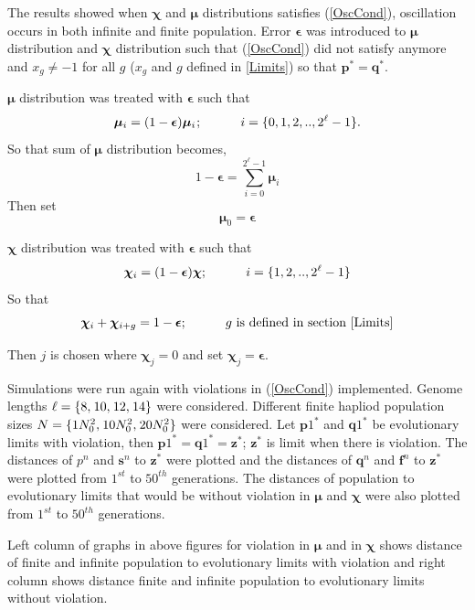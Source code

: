 The results showed when $\bm{\chi}$ and $\bm{\mu}$ distributions satisfies (\ref{OscCond}), oscillation occurs in both infinite and finite population. 
Error $\bm{\epsilon}$ was introduced to $\bm{\mu}$ distribution and $\bm{\chi}$ distribution such that (\ref{OscCond}) did not satisfy anymore and 
$x_g \neq −1$ for all $g$ ($x_g$ and $g$ defined in \ref{Limits}) so that $\bm{p}^\ast = \bm{q}^\ast$.

$\bm{\mu}$ distribution was treated with $\bm{\epsilon}$ such that
\[
\bm{\mu}_i = (1-\bm{\epsilon}) \bm{\mu}_i \hspace{0.01in}; \hspace{30pt} i = \{0, 1, 2,.., 2^{\ell}-1\}.
\]
So that sum of $\bm{\mu}$ distribution becomes, 
\[
1-\bm{\epsilon} = \sum \limits_{i=0}^{2^{\ell}-1} \bm{\mu}_i
\]
Then set
\[
\bm{\mu}_0 = \bm{\epsilon}
\]

$\bm{\chi}$ distribution was treated with $\bm{\epsilon}$ such that
\[
\bm{\chi}_i = (1-\bm{\epsilon}) \bm{\chi} ; \hspace{30pt} i = \{1, 2,.., 2^{\ell}-1\} 
\]
So that 
\[
\bm{\chi}_i + \bm{\chi}_{i+g} = 1-\bm{\epsilon} ; \hspace{30pt} g \text{ is defined in  section } \ref{Limits}
\]

Then $j$ is chosen where $\bm{\chi}_j = 0$ and set $\bm{\chi}_j = \bm{\epsilon}$. \newline

Simulations were run again with violations in (\ref{OscCond}) implemented. Genome lengths  $\ell = \{8, \hspace{0.01in} 10, \hspace{0.01in} 12, \hspace{0.01in} 14\}$ were considered. 
Different finite hapliod population sizes $N = \{1N_0^2, \hspace{0.01in} 10N_0^2, \hspace{0.01in} 20N_0^2\}$ were considered. 
\newline
Let ${\bm{p}1}^{\ast}$ and ${\bm{q}1}^{\ast}$ be evolutionary limits with violation, 
then ${\bm{p}1}^{\ast} = {\bm{q}1}^{\ast} = {\bm{z}}^\ast$; $\bm{z}^\ast$ is limit when there is violation.
The distances of ${p}^n$ and $\bm{s}^n$ to $\bm{z}^\ast$ were plotted and the distances of 
$\bm{q}^n$ and $\bm{f}^n$ to $\bm{z}^\ast$ were plotted from $1^{st}$ to $50^{th}$ generations. The distances of population to evolutionary limits that would be 
without violation in $\bm{\mu}$ and $\bm{\chi}$ were also plotted from $1^{st}$ to $50^{th}$ generations.






Left column of graphs in above figures for violation in $\bm{\mu}$ and in $\bm{\chi}$ shows distance of finite and infinite population to evolutionary limits with violation and 
right column shows distance finite and infinite population to evolutionary limits without violation. 

